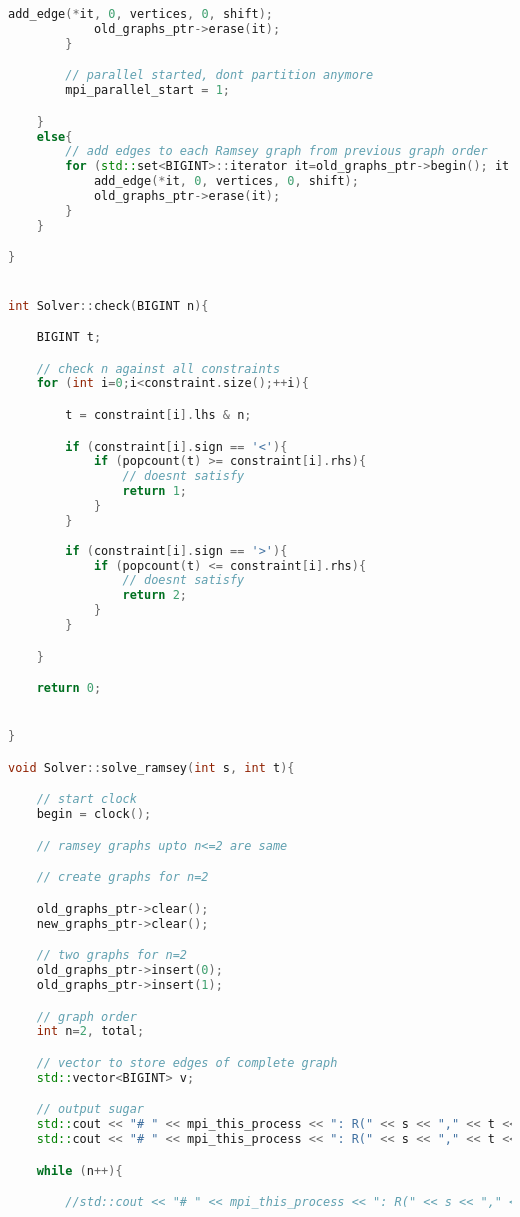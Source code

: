 \documentclass[12pt]{etsu_thesis}
\begin{document}
\begin{lstlisting}[language=C++]
            add_edge(*it, 0, vertices, 0, shift);
            old_graphs_ptr->erase(it);
        }

        // parallel started, dont partition anymore
        mpi_parallel_start = 1;

    }
    else{
        // add edges to each Ramsey graph from previous graph order
        for (std::set<BIGINT>::iterator it=old_graphs_ptr->begin(); it != old_graphs_ptr->end(); ++it){
            add_edge(*it, 0, vertices, 0, shift);
            old_graphs_ptr->erase(it);
        }
    }

}


int Solver::check(BIGINT n){

	BIGINT t;

	// check n against all constraints
	for (int i=0;i<constraint.size();++i){

		t = constraint[i].lhs & n;

		if (constraint[i].sign == '<'){
			if (popcount(t) >= constraint[i].rhs){
				// doesnt satisfy
				return 1;
			}
		}
		
		if (constraint[i].sign == '>'){
			if (popcount(t) <= constraint[i].rhs){
				// doesnt satisfy
				return 2;
			}
		}

	}

	return 0;


}

void Solver::solve_ramsey(int s, int t){

    // start clock
    begin = clock();

    // ramsey graphs upto n<=2 are same

    // create graphs for n=2

    old_graphs_ptr->clear();
    new_graphs_ptr->clear();

    // two graphs for n=2
    old_graphs_ptr->insert(0);
    old_graphs_ptr->insert(1);

    // graph order
    int n=2, total;

    // vector to store edges of complete graph
    std::vector<BIGINT> v;

    // output sugar
    std::cout << "# " << mpi_this_process << ": R(" << s << "," << t << "," << "1) = 1 [0s]" << std::endl;
    std::cout << "# " << mpi_this_process << ": R(" << s << "," << t << "," << "2) = 2 [0s]" << std::endl;

    while (n++){

        //std::cout << "# " << mpi_this_process << ": R(" << s << "," << t << "," << n << ") = " << std::flush;


\end{lstlisting}
\end{document}
